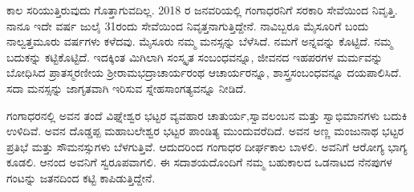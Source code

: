 {ಕಾಲ ಸರಿಯುತ್ತಿರುವುದು  ಗೊತ್ತಾಗುವದಿಲ್ಲ. 2018 ರ ಜನವರಿಯಲ್ಲಿ ಗಂಗಾಧರನಿಗೆ ಸರಕಾರಿ ಸೇವೆಯಿಂದ ನಿವೃತ್ತಿ. ನಾನೂ ಇದೇ ವರ್ಷ ಜುಲೈ 31ರಂದು ಸೇವೆಯಿಂದ ನಿವೃತ್ತನಾಗುತ್ತಿದ್ದೇನೆ. ನಾವಿಬ್ಬರೂ ಮೈಸೂರಿಗೆ ಬಂದು ನಾಲ್ವತ್ತಮೂರು ವರ್ಷಗಳು ಕಳೆದವು. ಮೈಸೂರು ನಮ್ಮ ಮನಸ್ಸನ್ನು ಬೆಳೆಸಿದೆ. ನಮಗೆ ಅನ್ನವನ್ನು ಕೊಟ್ಟಿದೆ. ನಮ್ಮ ಬದುಕನ್ನು ಕಟ್ಟಿಕೊಟ್ಟಿದೆ. ಇದಕ್ಕಿಂತ ಮಿಗಿಲಾಗಿ ಸಂಸ್ಕೃತ ಸಂಬಂಧವನ್ನೂ, ಜೀವನದ ಇಹ\enginline{-}ಪರಗಳ ಮರ್ಮವನ್ನು ಬೋಧಿಸಿದ ಪ್ರಾತಸ್ಮರಣೀಯ ಶ್ರೀರಾಮಭದ್ರಾಚಾರ್ಯರಂಥ ಆಚಾರ್ಯರನ್ನೂ, ಶಾಸ್ತ್ರಸಂಬಂಧವನ್ನೂ ದಯಪಾಲಿಸಿದೆ. ಸದಾ ಮನಸ್ಸನ್ನು ಜಾಗೃತವಾಗಿ ಇರಿಸುವ ಸ್ನೇಹ\enginline{-}ಸಾಂಗತ್ಯವನ್ನೂ ನೀಡಿದೆ. 

ಗಂಗಾಧರನಲ್ಲಿ ಅವನ ತಂದೆ ವಿಘ್ನೇಶ್ವರ ಭಟ್ಟರ ವ್ಯವಹಾರ ಚಾತುರ್ಯ,\break ಸ್ವಾವಲಂಬನ ಮತ್ತು ಸ್ವಾಭಿಮಾನಗಳು ಬದುಕಿ ಉಳಿದಿವೆ. ಅವನ ದೊಡ್ಡಪ್ಪ  ಮಹಾ\-ಬಲೇಶ್ವರ ಭಟ್ಟರ ಪಾಂಡಿತ್ಯ ಮುಂದುವರೆದಿದೆ.  ಅವನ ಅಣ್ಣ ಮಂಜುನಾಥ ಭಟ್ಟರ ಪ್ರತಿಭೆ ಮತ್ತು ಸೌಮನಸ್ಸುಗಳು ಬೆಳಗುತ್ತಿವೆ. ಆದುದರಿಂದ ಗಂಗಾಧರ ದೀರ್ಘಕಾಲ ಬಾಳಲಿ. ಅವನಿಗೆ ಆರೋಗ್ಯ ಭಾಗ್ಯ ಕೂಡಲಿ. ಆನಂದ ಅವನಿಗೆ ಸ್ವರೂಪವಾಗಲಿ. ಈ ಸದಾಶಯದೊಂದಿಗೆ ನಮ್ಮ ಬಹುಕಾಲದ ಒಡನಾಟದ ನೆನಪುಗಳ ಗಂಟನ್ನು ಜತನದಿಂದ ಕಟ್ಟಿ ಕಾಪಿಡುತ್ತಿದ್ದೇನೆ.

\articleend

}
